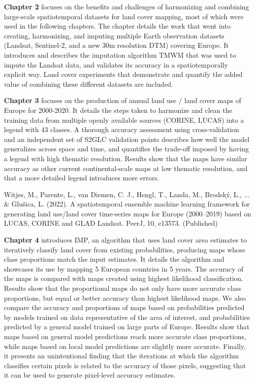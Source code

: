 \textbf{Chapter 2} focuses on the benefits and challenges of harmonizing and combining large-scale spatiotemporal datasets for land cover mapping, most of which were used in the following chapters. The chapter details the work that went into creating, harmonizing, and imputing multiple Earth observation datasets (Landsat, Sentinel-2, and a new 30m resolution DTM) covering Europe. It introduces and describes the imputation algorithm TMWM that was used to impute the Landsat data, and validates its accuracy in a spatiotemporally explicit way. Land cover experiments that demonstrate and quantify the added value of combining these different datasets are included.


\textbf{Chapter 3} focuses on the production of annual land use / land cover maps of Europe for 2000-2020. It details the steps taken to harmonize and clean the training data from multiple openly available sources (CORINE, LUCAS) into a legend with 43 classes. A thorough accuracy assessment using cross-validation and an independent set of S2GLC validation points describes how well the model generalizes across space and time, and quantifies the trade-off imposed by having a legend with high thematic resolution. Results show that the maps have similar accuracy as other current continental-scale maps at low thematic resolution, and that a more detailed legend introduces more errors.

Witjes, M., Parente, L., van Diemen, C. J., Hengl, T., Landa, M., Brodský, L., ... \& Glušica, L. (2022). A spatiotemporal ensemble machine learning framework for generating land use/land cover time-series maps for Europe (2000–2019) based on LUCAS, CORINE and GLAD Landsat. PeerJ, 10, e13573. (Published)

\textbf{Chapter 4} introduces IMP, an algorithm that uses land cover area estimates to iteratively classify land cover from existing probabilities, producing maps whose class proportions match the input estimates. It details the algorithm and showcases its use by mapping 5 European countries in 5 years. The accuracy of the maps is compared with maps created using highest likelihood classification. Results show that the proportional maps do not only have more accurate class proportions, but equal or better accuracy than highest likelihood maps. We also compare the accuracy and proportions of maps based on probabilities predicted by models trained on data representative of the area of interest, and probabilities predicted by a general model trained on large parts of Europe. Results show that maps based on general model predictions reach more accurate class proportions, while maps based on local model predictions are slightly more accurate. Finally, it presents an unintentional finding that the iterations at which the algorithm classifies certain pixels is related to the accuracy of those pixels, suggesting that it can be used to generate pixel-level accuracy estimates.

